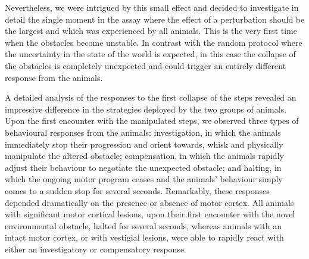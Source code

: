 Nevertheless, we were intrigued by this small effect and decided to investigate in detail the single moment in the assay where the effect of a perturbation should be the largest and which was experienced by all animals. This is the very first time when the obstacles become unstable. In contrast with the random protocol where the uncertainty in the state of the world is expected, in this case the collapse of the obstacles is completely unexpected and could trigger an entirely different response from the animals.

A detailed analysis of the responses to the first collapse of the steps revealed an impressive difference in the strategies deployed by the two groups of animals. Upon the first encounter with the manipulated steps, we observed three types of behavioural responses from the animals: investigation, in which the animals immediately stop their progression and orient towards, whisk and physically manipulate the altered obstacle; compensation, in which the animals rapidly adjust their behaviour to negotiate the unexpected obstacle; and halting, in which the ongoing motor program ceases and the animals' behaviour simply comes to a sudden stop for several seconds. Remarkably, these responses depended dramatically on the presence or absence of motor cortex. All animals with significant motor cortical lesions, upon their first encounter with the novel environmental obstacle, halted for several seconds, whereas animals with an intact motor cortex, or with vestigial lesions, were able to rapidly react with either an investigatory or compensatory response.
